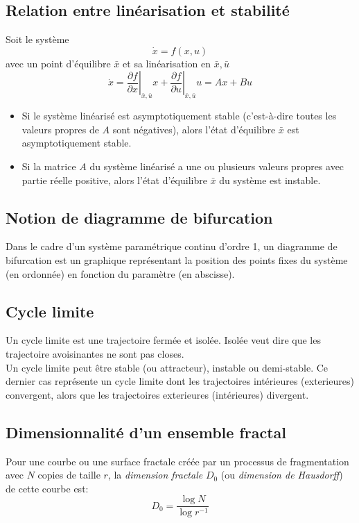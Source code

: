 \documentclass[a4paper]{article}
\begin{document}
\subsection{Relation entre linéarisation et stabilité}
Soit le système
\[\dot x=f(x,u)\]
avec un point d'équilibre \(\bar x\) et sa linéarisation en \(\bar x,\bar u\)
\[
	\dot x=\left. \frac{\partial f}{\partial x}\right|_{\bar x,\bar u}x
	+\left. \frac{\partial f}{\partial u}\right|_{\bar x,\bar u}u
	=Ax+Bu
\]
\begin{itemize}
	\item Si le système linéarisé est asymptotiquement stable
		(c'est-à-dire toutes les valeurs propres de \(A\) sont négatives),
		alors l'état d'équilibre \(\bar x\) est asymptotiquement stable.
	\item Si la matrice \(A\) du système linéarisé a une ou plusieurs valeurs
	propres avec partie réelle positive, alors l'état d'équilibre \(\bar x\)
	du système est instable.
\end{itemize}

\subsection{Notion de diagramme de bifurcation}
Dans le cadre d'un système paramétrique continu d'ordre 1, un diagramme
de bifurcation est un graphique représentant la position des points fixes
du système (en ordonnée) en fonction du paramètre (en abscisse).

\subsection{Cycle limite}
Un cycle limite est une trajectoire fermée et isolée. Isolée veut dire
que les trajectoire avoisinantes ne sont pas closes.\\
Un cycle limite peut être stable (ou attracteur), instable ou demi-stable.
Ce dernier cas représente un cycle limite dont les trajectoires intérieures
(exterieures) convergent, alors que les trajectoires exterieures (intérieures)
divergent.

\subsection{Dimensionnalité d'un ensemble fractal}
Pour une courbe ou une surface fractale créée par un processus de
fragmentation avec \(N\) copies de taille \(r\), la \emph{dimension
fractale} \(D_0\) (ou \emph{dimension de Hausdorff}) de cette courbe est:
\[D_0=\frac{\log N}{\log r^{-1}}\]
\end{document}
